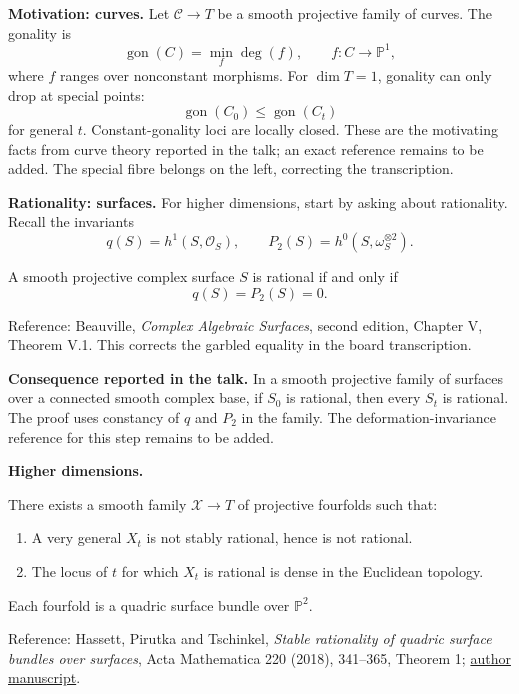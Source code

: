 \medskip\noindent
{\bf Motivation: curves.}
Let $\mathcal{C}\to T$ be a smooth
projective family of curves.
The gonality is
$$
\operatorname{gon}(C)=\min_f\deg(f),
\qquad f:C\to\mathbb{P}^1,
$$
where $f$ ranges over nonconstant
morphisms.
For $\dim T=1$, gonality can only drop
at special points:
$$
\operatorname{gon}(C_0)
\leq\operatorname{gon}(C_t)
$$
for general $t$.
Constant-gonality loci are locally closed.
These are the motivating facts from
curve theory reported in the talk;
an exact reference remains to be added.
The special fibre belongs on the left,
correcting the transcription.

\medskip\noindent
{\bf Rationality: surfaces.}
For higher dimensions, start by asking
about rationality.
Recall the invariants
$$
q(S)=h^1(S,\mathcal{O}_S),
\qquad
P_2(S)=h^0(S,\omega_S^{\otimes 2}).
$$

\begin{theorem}[Castelnuovo]
\label{theorem-chen-castelnuovo}
A smooth projective complex surface $S$
is rational if and only if
$$
q(S)=P_2(S)=0.
$$
\end{theorem}

\noindent
Reference: Beauville,
{\it Complex Algebraic Surfaces},
second edition, Chapter V, Theorem V.1.
This corrects the garbled equality
in the board transcription.

\medskip\noindent
{\bf Consequence reported in the talk.}
In a smooth projective family of surfaces
over a connected smooth complex base,
if $S_0$ is rational, then every $S_t$
is rational. The proof uses constancy
of $q$ and $P_2$ in the family.
The deformation-invariance reference
for this step remains to be added.

\medskip\noindent
{\bf Higher dimensions.}

\begin{theorem}
\label{theorem-chen-hpt}
There exists a smooth family
$\mathcal{X}\to T$ of projective
fourfolds such that:
\begin{enumerate}
\item A very general $X_t$ is not stably
rational, hence is not rational.
\item The locus of $t$ for which $X_t$
is rational is dense in the Euclidean
topology.
\end{enumerate}
Each fourfold is a quadric surface
bundle over $\mathbb{P}^2$.
\end{theorem}

\noindent
Reference: Hassett, Pirutka and Tschinkel,
{\it Stable rationality of quadric
surface bundles over surfaces},
Acta Mathematica 220 (2018), 341--365,
Theorem 1;
\href{https://arxiv.org/abs/1603.09262}
{author manuscript}.

